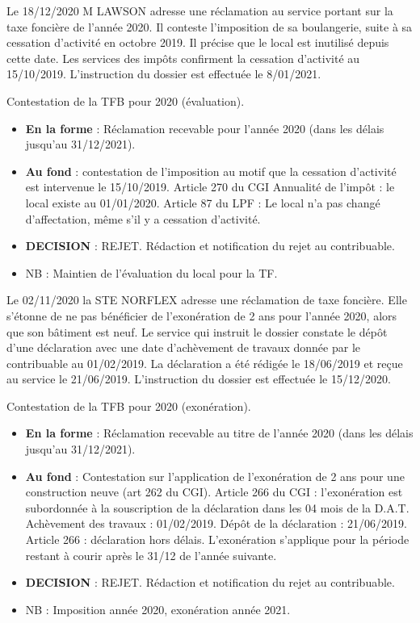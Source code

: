 \documentclass[answers, 12pt]{exam}
\begin{document}
\begin{questions}
		\question Le 18/12/2020 M LAWSON adresse une réclamation au service portant sur la taxe foncière de l'année 2020. Il conteste l'imposition de sa boulangerie, suite à sa cessation d'activité en octobre 2019. Il précise que le local est inutilisé depuis cette date. Les services des impôts confirment la cessation d'activité au 15/10/2019. L'instruction du dossier est effectuée le 8/01/2021.
		\begin{solution}
			Contestation de la TFB pour 2020 (évaluation).
			\begin{itemize}
				\item \textbf{En la forme} : Réclamation recevable pour l'année 2020 (dans les délais jusqu'au 31/12/2021).
				\item \textbf{Au fond} : contestation de l'imposition au motif que la cessation d'activité est intervenue le 15/10/2019. Article 270 du CGI Annualité de l'impôt : le local existe au 01/01/2020. Article 87 du LPF : Le local n'a pas changé d'affectation, même s'il y a cessation d'activité.
				\item \textbf{DECISION} : REJET. Rédaction et notification du rejet au contribuable.
				\item NB : Maintien de l'évaluation du local pour la TF.
			\end{itemize}
		\end{solution}
		
		\question Le 02/11/2020 la STE NORFLEX adresse une réclamation de taxe foncière. Elle s'étonne de ne pas bénéficier de l'exonération de 2 ans  pour l'année 2020, alors que son bâtiment est neuf. Le service qui instruit le dossier constate le dépôt d'une déclaration avec une date d'achèvement de travaux donnée par le contribuable au 01/02/2019. La déclaration a été rédigée le 18/06/2019 et reçue au service le 21/06/2019. L'instruction du dossier est effectuée le 15/12/2020.
		\begin{solution}
			Contestation de la TFB pour 2020 (exonération).
			\begin{itemize}
				\item \textbf{En la forme} : Réclamation recevable au titre de l'année 2020 (dans les délais jusqu'au 31/12/2021).
				\item \textbf{Au fond} : Contestation sur l'application de l'exonération de 2 ans  pour une construction neuve (art 262 du CGI). Article 266 du CGI : l'exonération est subordonnée à la souscription de la déclaration dans les 04 mois de la D.A.T. Achèvement des travaux : 01/02/2019. Dépôt de la déclaration : 21/06/2019. Article 266 : déclaration hors délais. L'exonération s'applique pour la période restant à courir après le 31/12 de l'année suivante.
				\item \textbf{DECISION} : REJET. Rédaction et notification du rejet au contribuable.
				\item NB : Imposition année 2020, exonération année 2021.
			\end{itemize}
		\end{solution}
		

\end{questions}
\end{document}
